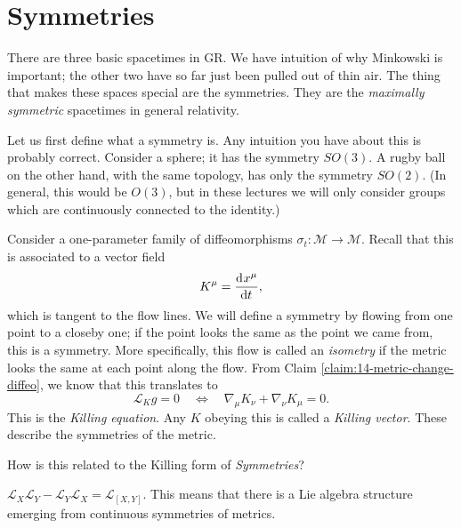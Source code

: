 \section{Symmetries}%
\label{sec:symmetries}

There are three basic spacetimes in GR.
We have intuition of why Minkowski is important; the other two have so far just been pulled out of thin air. The thing that makes these spaces special are the symmetries.
They are the \emph{maximally symmetric} spacetimes in general relativity.

Let us first define what a symmetry is.
Any intuition you have about this is probably correct. 
Consider a sphere; it has the symmetry $SO(3)$. A rugby ball on the other hand, with the same topology, has only the symmetry $SO(2)$.
(In general, this would be $O(3)$, but in these lectures we will only consider groups which are continuously connected to the identity.)

Consider a one-parameter family of diffeomorphisms $\sigma_t \colon \mathcal{M} \to \mathcal{M}$.
Recall that this is associated to a vector field
\begin{equation}
  K^{\mu} = \dv[]{x^{\mu}}{t},
\end{equation}
which is tangent to the flow lines.
We will define a symmetry by flowing from one point to a closeby one; if the point looks the same as the point we came from, this is a symmetry.
More specifically, this flow is called an \emph{isometry} if the metric looks the same at each point along the flow.
From Claim \ref{claim:14-metric-change-diffeo}, we know that this translates to 
\begin{equation}
  \label{eq:killing}
  \mathcal{L}_K g = 0 \quad \iff \quad \nabla_{\mu} K_{\nu} + \nabla_{\nu} K_{\mu} = 0.
\end{equation}
This is the \emph{Killing equation}. Any $K$ obeying this is called a \emph{Killing vector}. These describe the symmetries of the metric.
\begin{leftbar}
  \begin{remark}
    How is this related to the Killing form of \emph{Symmetries}?
  \end{remark}
\end{leftbar}
\begin{leftbar}
  \begin{remark}
    $\mathcal{L}_X \mathcal{L}_Y - \mathcal{L}_Y \mathcal{L}_X = \mathcal{L}_{[X, Y]}$.
    This means that there is a Lie algebra structure emerging from continuous symmetries of metrics.
  \end{remark}
\end{leftbar}


